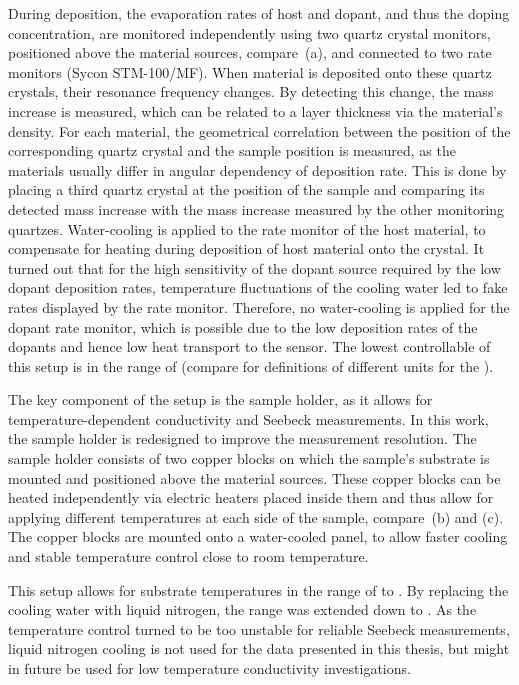 During deposition, the evaporation rates of host and dopant, and thus the doping concentration, are monitored independently using two quartz crystal monitors, positioned above the material sources, compare \,(a), and connected to two rate monitors (Sycon STM-100/MF). When material is deposited onto these quartz crystals, their resonance frequency changes. By detecting this change, the mass increase is measured, which can be related to a layer thickness via the material's density. For each material, the geometrical correlation between the position of the corresponding quartz crystal and the sample position is measured, as the materials usually differ in angular dependency of deposition rate. This is done by placing a third quartz crystal at the position of the sample and comparing its detected mass increase with the mass increase measured by the other monitoring quartzes.
Water-cooling is applied to the rate monitor of the host material, to compensate for heating during deposition of host material onto the crystal. It turned out that for the high sensitivity of the dopant source required by the low dopant deposition rates, temperature fluctuations of the cooling water led to fake rates displayed by the rate monitor. Therefore, no water-cooling is applied for the dopant rate monitor, which is possible due to the low deposition rates of the dopants and hence low heat transport to the sensor. The lowest controllable \CLong of this setup is in the range of  (compare  for definitions of different units for the \CLong).

The key component of the setup is the sample holder, as it allows for temperature-dependent conductivity and Seebeck measurements. In this work, the sample holder is redesigned to improve the measurement resolution. The sample holder consists of two copper blocks on which the sample's substrate is mounted and positioned above the material sources. These copper blocks can be heated independently via electric heaters placed inside them and thus allow for applying different temperatures at each side of the sample, compare \,(b) and (c). The copper blocks are mounted onto a water-cooled panel, to allow faster cooling and stable temperature control close to room temperature.

This setup allows for substrate temperatures in the range of \Tsub[20] to . By replacing the cooling water with liquid nitrogen, the range was extended down to \Tsub[-120]. As the temperature control turned to be too unstable for reliable Seebeck measurements, liquid nitrogen cooling is not used for the data presented in this thesis, but might in future be used for low temperature conductivity investigations.

